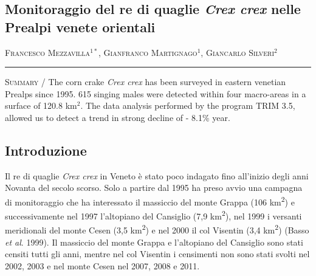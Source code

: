 \setcounter{figure}{0}
\setcounter{table}{0}

\begin{adjustwidth}{-3.5cm}{0cm}
\pagestyle{CIOpage}
\chapter*[Il re di quaglie nelle Prealpi venete orientali]{Monitoraggio del re di quaglie \textbf{\textit{Crex crex}}\textbf{ nelle Prealpi venete orientali}}

\textsc{Francesco Mezzavilla}$^{1*}$, \textsc{Gianfranco Martignago}$^{1}$,
\textsc{Giancarlo Silveri}$^{2}$\\

  
\noindent\color{MUSEBLUE}\rule{27cm}{2pt}
\vspace{1cm}
\end{adjustwidth}



{\small
\noindent \textsc{\color{MUSEBLUE} Summary} / The corn crake \textit{Crex crex} has been surveyed in eastern venetian Prealps since 1995. 615 singing males were detected within four macro-areas in a surface of ​​120.8 km$^2$. The data analysis performed by the program TRIM 3.5, allowed us to detect a trend in strong decline of - 8.1\% year.\\
}
\section*{Introduzione}
Il re di quaglie \textit{Crex crex }in Veneto \`e stato poco indagato
fino all{\textquoteright}inizio degli anni Novanta del secolo scorso.
Solo a partire dal 1995 ha preso avvio una campagna di monitoraggio che
ha interessato  il massiccio del monte Grappa (106
km\textsuperscript{2}) e successivamente nel 1997
l{\textquoteright}altopiano del Cansiglio (7,9 km\textsuperscript{2}),
nel 1999 i versanti meridionali del monte Cesen (3,5
km\textsuperscript{2}) e nel 2000 il col Visentin (3,4
km\textsuperscript{2}) (Basso \textit{et al}. 1999). Il massiccio del
monte Grappa e l{\textquoteright}altopiano del Cansiglio sono stati
censiti tutti gli anni, mentre nel col Visentin i censimenti non sono
stati svolti nel 2002, 2003 e nel monte Cesen nel 2007, 2008 e 2011. 


